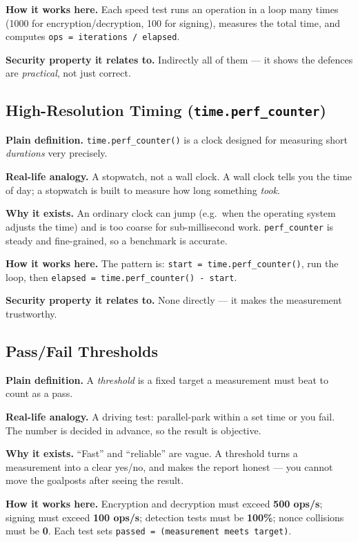 \documentclass[11pt,a4paper]{report}
\begin{document}
\textbf{How it works here.} Each speed test runs an operation in a loop many
times (1000 for encryption/decryption, 100 for signing), measures the total time,
and computes \texttt{ops = iterations / elapsed}.

\textbf{Security property it relates to.} Indirectly all of them --- it shows the
defences are \emph{practical}, not just correct.

\subsection{High-Resolution Timing (\texttt{time.perf\_counter})}
\textbf{Plain definition.} \texttt{time.perf\_counter()} is a clock designed for
measuring short \emph{durations} very precisely.

\textbf{Real-life analogy.} A stopwatch, not a wall clock. A wall clock tells you
the time of day; a stopwatch is built to measure how long something \emph{took}.

\textbf{Why it exists.} An ordinary clock can jump (e.g.\ when the operating
system adjusts the time) and is too coarse for sub-millisecond work.
\texttt{perf\_counter} is steady and fine-grained, so a benchmark is accurate.

\textbf{How it works here.} The pattern is: \texttt{start = time.perf\_counter()},
run the loop, then \texttt{elapsed = time.perf\_counter() - start}.

\textbf{Security property it relates to.} None directly --- it makes the
measurement trustworthy.

\subsection{Pass/Fail Thresholds}
\textbf{Plain definition.} A \emph{threshold} is a fixed target a measurement
must beat to count as a pass.

\textbf{Real-life analogy.} A driving test: parallel-park within a set time or you
fail. The number is decided in advance, so the result is objective.

\textbf{Why it exists.} ``Fast'' and ``reliable'' are vague. A threshold turns a
measurement into a clear yes/no, and makes the report honest --- you cannot move
the goalposts after seeing the result.

\textbf{How it works here.} Encryption and decryption must exceed
\textbf{500 ops/s}; signing must exceed \textbf{100 ops/s}; detection tests must
be \textbf{100\%}; nonce collisions must be \textbf{0}. Each test sets
\texttt{passed = (measurement\ meets\ target)}.
\end{document}
